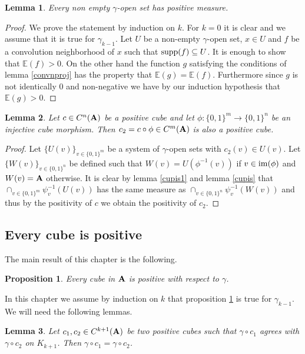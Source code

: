 \documentclass [11pt] {article}
\newtheorem{lemma}{Lemma}[section]
\newtheorem{proposition}{Proposition}[section]
\def\im{{\rm im}}
\def\bA{{\bf A}}
\begin{document}
\begin{lemma}\label{openpos} Every non empty $\gamma$-open set has positive measure.
\end{lemma}

\begin{proof} We prove the statement by induction on $k$. For $k=0$ it is clear and we assume that it is true for $\gamma_{k-1}$. Let $U$ be a non-empty $\gamma$-open set, $x\in U$ and $f$ be a convolution neighborhood of $x$ such that ${\rm supp}(f)\subseteq U$. It is enough to show that $\mathbb{E}(f)>0$. On the other hand the function $g$ satisfying the conditions of lemma \ref{convnproj} has the property that $\mathbb{E}(g)=\mathbb{E}(f)$. Furthermore since $g$ is not identically $0$ and non-negative we have by our induction hypothesis that $\mathbb{E}(g)>0$.
\end{proof}


\begin{lemma}\label{pospreshef} Let $c\in C^n(\bA)$ be a positive cube and let $\phi:\{0,1\}^m\rightarrow\{0,1\}^n$ be an injective cube morphism. Then $c_2=c\circ\phi\in C^m(\bA)$ is also a positive cube. 
\end{lemma}

\begin{proof} Let $\{U(v)\}_{v\in\{0,1\}^m}$ be a system of $\gamma$-open sets with $c_2(v)\in U(v)$. Let $\{W(v)\}_{v\in\{0,1\}^n}$ be defined such that $W(v)=U(\phi^{-1}(v))$ if $v\in\im(\phi)$ and $W(v)=\bA$ otherwise. It is clear by lemma \ref{cupis1} and lemma \ref{cupis} that $\cap_{v\in\{0,1\}^m}\psi_v^{-1}(U(v))$ has the same measure as $\cap_{v\in\{0,1\}^n}\psi_v^{-1}(W(v))$ and thus by the positivity of $c$ we obtain the positivity of $c_2$.
\end{proof}

\subsection{Every cube is positive}

The main result of this chapter is the following.

\begin{proposition}\label{cubepos} Every cube in $\bA$ is positive with respect to $\gamma$.
\end{proposition}

In this chapter we assume by induction on $k$ that proposition \ref{cubepos} is true for $\gamma_{k-1}$.
We will need the following lemmas.

\begin{lemma}\label{uniqclos1} Let $c_1,c_2\in C^{k+1}(\bA)$ be two positive cubes such that $\gamma\circ c_1$ agrees with $\gamma\circ c_2$ on $K_{k+1}$. Then $\gamma\circ c_1=\gamma\circ c_2$.
\end{lemma}
\end{document}
